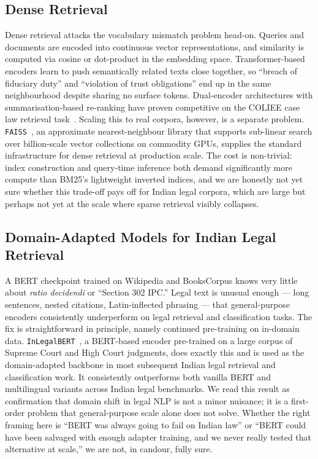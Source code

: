 \subsection{Dense Retrieval}

Dense retrieval attacks the vocabulary mismatch problem head-on. Queries and documents are encoded into continuous vector representations, and similarity is computed via cosine or dot-product in the embedding space. Transformer-based encoders learn to push semantically related texts close together, so ``breach of fiduciary duty'' and ``violation of trust obligations'' end up in the same neighbourhood despite sharing no surface tokens. Dual-encoder architectures with summarisation-based re-ranking have proven competitive on the COLIEE case law retrieval task~\cite{althammer-etal-2021-dossier}. Scaling this to real corpora, however, is a separate problem. \texttt{FAISS}~\cite{johnson-etal-2021-faiss}, an approximate nearest-neighbour library that supports sub-linear search over billion-scale vector collections on commodity GPUs, supplies the standard infrastructure for dense retrieval at production scale. The cost is non-trivial: index construction and query-time inference both demand significantly more compute than BM25's lightweight inverted indices, and we are honestly not yet sure whether this trade-off pays off for Indian legal corpora, which are large but perhaps not yet at the scale where sparse retrieval visibly collapses.

\subsection{Domain-Adapted Models for Indian Legal Retrieval}

A BERT checkpoint trained on Wikipedia and BooksCorpus knows very little about \emph{ratio decidendi} or ``Section 302 IPC.'' Legal text is unusual enough — long sentences, nested citations, Latin-inflected phrasing — that general-purpose encoders consistently underperform on legal retrieval and classification tasks. The fix is straightforward in principle, namely continued pre-training on in-domain data. \texttt{InLegalBERT}~\cite{paul-etal-2023-inlegalbert}, a BERT-based encoder pre-trained on a large corpus of Supreme Court and High Court judgments, does exactly this and is used as the domain-adapted backbone in most subsequent Indian legal retrieval and classification work. It consistently outperforms both vanilla BERT and multilingual variants across Indian legal benchmarks. We read this result as confirmation that domain shift in legal NLP is not a minor nuisance; it is a first-order problem that general-purpose scale alone does not solve. Whether the right framing here is ``BERT was always going to fail on Indian law'' or ``BERT could have been salvaged with enough adapter training, and we never really tested that alternative at scale,'' we are not, in candour, fully sure.


